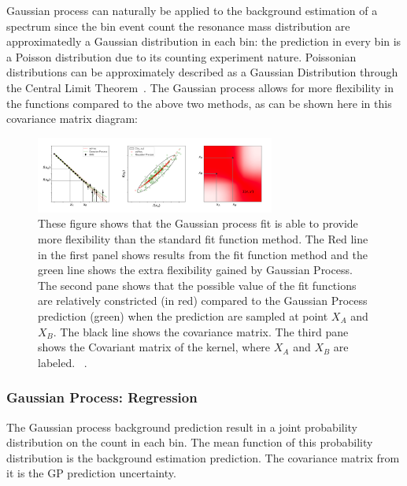     Gaussian process can naturally be applied to the background estimation of a spectrum since the bin event count the resonance mass distribution are approximatedly a Gaussian distribution in each bin: the prediction in every bin is a Poisson distribution due to its counting experiment nature. Poissonian distributions can be approximately described as a Gaussian Distribution through the Central Limit Theorem~\cite{kwak2017central}. The Gaussian process allows for more flexibility in the functions compared to the above two methods, as can be shown here in this covariance matrix diagram:

    \begin{figure}[!htb]
        \begin{center}
            \includegraphics[width=0.7\textwidth]{figures/chapter_analysismethod/GP}
            \caption{
                These figure shows that the Gaussian process fit is able to provide more flexibility than the standard fit function method. The Red line in the first panel shows results from the fit function method and the green line shows the extra flexibility gained by Gaussian Process. The second pane shows that the possible value of the fit functions are relatively constricted (in red) compared to the Gaussian Process prediction (green) when the prediction are sampled at point $X_{A}$ and $X_{B}$. The black line shows the covariance matrix. The third pane shows the Covariant matrix of the kernel, where $X_{A}$ and $X_{B}$ are labeled. ~\cite{frate2017modeling}.
            }
            \label{fig:GaussianProcess}
        \end{center}
    \end{figure}
    \FloatBarrier


\subsubsection{Gaussian Process: Regression}

The Gaussian process background prediction result in a joint probability distribution on the count in each bin. The mean function of this probability distribution is the background estimation prediction. The covariance matrix from it is the GP prediction uncertainty.

